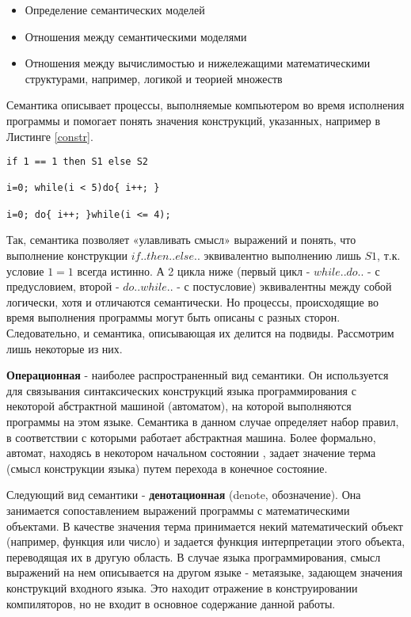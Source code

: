 \documentclass[a4paper,14pt]{extreport} %
\begin{document}
\begin{itemize}
    \item Определение семантических моделей
    \item Отношения между семантическими моделями
    \item Отношения между вычислимостью и нижележащими математическими структурами, например, логикой и теорией множеств
\end{itemize}



Семантика описывает процессы, выполняемые компьютером во время исполнения программы и помогает понять значения конструкций, указанных, например в Листинге \ref{constr}.



\begin{lstlisting}[caption={Примеры конструкции языка программирования}, label={constr}]
if 1 == 1 then S1 else S2

i=0; while(i < 5)do{ i++; }

i=0; do{ i++; }while(i <= 4);
\end{lstlisting}


	Так, семантика позволяет «улавливать смысл» выражений и понять, что выполнение конструкции $if..then..else..$ эквивалентно выполнению лишь $S1$, т.к. условие $1 = 1$ всегда истинно. А 2 цикла ниже (первый цикл - $while..do..$ - с предусловием, второй - $do..while..$ - с постусловие) эквивалентны между собой логически, хотя и отличаются семантически.
	Но процессы, происходящие во время выполнения программы могут быть описаны с разных сторон. Следовательно, и семантика, описывающая их делится на подвиды. Рассмотрим лишь некоторые из них.

	\textbf{Операционная} - наиболее распространенный вид семантики. Он используется для связывания синтаксических конструкций языка программирования с некоторой абстрактной машиной (автоматом), на которой выполняются программы на этом языке. Семантика в данном случае определяет набор правил, в соответствии с которыми работает абстрактная машина.
	Более формально, автомат, находясь в некотором начальном состоянии , задает значение терма (смысл конструкции языка) путем перехода в конечное состояние.


	Следующий вид семантики - \textbf{денотационная} (denote, обозначение). Она занимается сопоставлением выражений программы с математическими объектами. В качестве значения терма принимается некий математический объект (например, функция или число) и задается функция интерпретации этого объекта, переводящая их в другую область.
	В случае языка программирования, смысл выражений на нем описывается на другом языке - метаязыке, задающем значения конструкций входного языка. Это находит отражение в конструировании компиляторов, но не входит в основное содержание данной работы.
\end{document}

